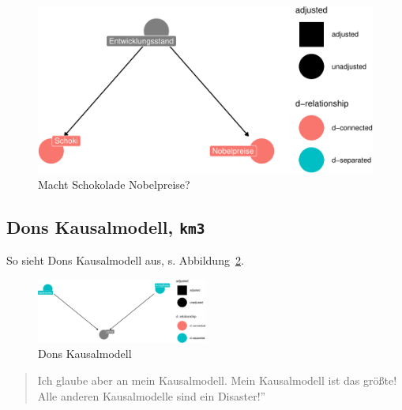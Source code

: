 \documentclass[
  a4paper,
  DIV=11]{scrreprt}
\theoremstyle{definition}
\theoremstyle{remark}
\begin{document}
\begin{figure}

{\centering \includegraphics{./kausal_files/figure-pdf/fig-schoki-dag-1.pdf}

}

\caption{\label{fig-schoki-dag}Macht Schokolade Nobelpreise?}

\end{figure}

\hypertarget{dons-kausalmodell-km3}{%
\subsection{\texorpdfstring{Dons Kausalmodell,
\texttt{km3}}{Dons Kausalmodell, km3}}\label{dons-kausalmodell-km3}}

So sieht Dons Kausalmodell aus, s. Abbildung~\ref{fig-km3}.

\begin{figure}

{\centering \includegraphics[width=0.5\textwidth,height=\textheight]{./kausal_files/figure-pdf/fig-km3-1.pdf}

}

\caption{\label{fig-km3}Dons Kausalmodell}

\end{figure}

\begin{quote}
Ich glaube aber an mein Kausalmodell. Mein Kausalmodell ist das größte!
Alle anderen Kausalmodelle sind ein Disaster!''
\end{quote}

🧑
\end{document}
